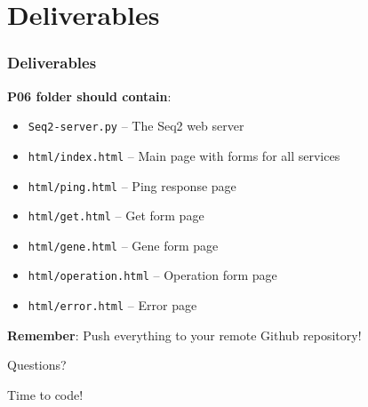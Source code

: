 \documentclass[xcolor=table]{beamer}
\begin{document}

\section{Deliverables}

\begin{frame}
\frametitle{Deliverables}

\textbf{P06 folder should contain}:

\vspace{0.2cm}

\begingroup\small
\begin{itemize}
\item \texttt{Seq2-server.py} -- The Seq2 web server
\item \texttt{html/index.html} -- Main page with forms for all services
\item \texttt{html/ping.html} -- Ping response page
\item \texttt{html/get.html} -- Get form page
\item \texttt{html/gene.html} -- Gene form page
\item \texttt{html/operation.html} -- Operation form page
\item \texttt{html/error.html} -- Error page
\end{itemize}
\endgroup

\vspace{0.3cm}

\textbf{Remember}: Push everything to your remote Github repository!

\end{frame}


\begin{frame}
\begin{center}
\Huge{Questions?}

\vspace{1cm}

\Large{Time to code!}
\end{center}
\end{frame}
\end{document}
